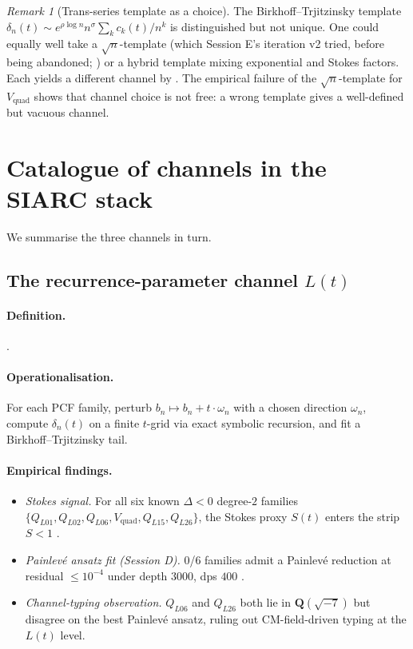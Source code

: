 \documentclass[11pt,reqno]{amsart}
\theoremstyle{plain}
\theoremstyle{definition}
\theoremstyle{remark}
\newtheorem{remark}[theorem]{Remark}
\newcommand{\Lt}{L(t)}
\newcommand{\Vquad}{V_{\mathrm{quad}}}
\newcommand{\dn}{\delta_{n}}
\begin{document}
\begin{remark}[Trans-series template as a choice]
\label{rem:template}
The Birkhoff--Trjitzinsky template
$\dn(t) \sim e^{\rho \log n} n^{\sigma} \sum_k c_k(t)/n^k$
is distinguished but not unique. One could equally well
take a $\sqrt n$-template (which Session E's iteration v2
tried, before being abandoned;
\cite{siarc_borel_5x}) or a hybrid template
mixing exponential and Stokes factors. Each yields a
different channel by . The empirical
failure of the $\sqrt n$-template for $\Vquad$ shows that
channel choice is not free: a wrong template gives a
well-defined but vacuous channel.
\end{remark}

\section{Catalogue of channels in the SIARC stack}
\label{sec:catalogue}

We summarise the three channels in turn.

\subsection{The recurrence-parameter channel $\Lt$}
\label{ssec:lt}

\paragraph{Definition.} .

\paragraph{Operationalisation.} For each PCF family, perturb
$b_n \mapsto b_n + t \cdot \omega_n$ with a chosen direction
$\omega_n$, compute $\dn(t)$ on a finite $t$-grid via exact
symbolic recursion, and fit a Birkhoff--Trjitzinsky tail.

\paragraph{Empirical findings.}
\begin{itemize}
\item \emph{Stokes signal.} For all six known $\Delta<0$
degree-$2$ families
$\{Q_{L01}, Q_{L02}, Q_{L06}, \Vquad, Q_{L15}, Q_{L26}\}$,
the Stokes proxy $S(t)$ enters the strip $S<1$
\cite{siarc_pcf1_v13}.
\item \emph{Painlev\'e ansatz fit (Session D).} 0/6 families
admit a Painlev\'e reduction at residual $\le 10^{-4}$
under depth $3000$, dps $400$ \cite{siarc_painleve_deep_6x}.
\item \emph{Channel-typing observation.} $Q_{L06}$ and
$Q_{L26}$ both lie in $\mathbf{Q}(\sqrt{-7})$ but disagree
on the best Painlev\'e ansatz, ruling out CM-field-driven
typing at the $\Lt$ level.
\end{itemize}
\end{document}

